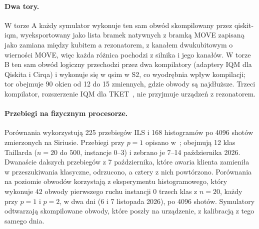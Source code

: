 \documentclass{scspaperproc}
\begin{document}
\paragraph{Dwa tory.}
W torze A każdy symulator wykonuje ten sam obwód skompilowany przez
qiskit-iqm, wyeksportowany jako lista bramek natywnych z bramką MOVE zapisaną
jako zamiana między kubitem a rezonatorem, z kanałem dwukubitowym o wierności
MOVE, więc każda różnica pochodzi z silnika i jego kanałów. W torze B ten sam
obwód logiczny przechodzi przez dwa kompilatory (adaptery IQM dla Qiskita
i Cirqa) i wykonuje się w qsim w S2, co wyodrębnia wpływ kompilacji; tor
obejmuje 90 okien od 12 do 15 zmiennych, gdzie obwody są najdłuższe. Trzeci
kompilator, rozszerzenie IQM dla TKET~\cite{sivarajah2020tket}, nie przyjmuje
urządzeń z rezonatorem.

\paragraph{Przebiegi na fizycznym procesorze.}
Porównania wykorzystują 225 przebiegów ILS i 168 histogramów po 4096 shotów
zmierzonych na Siriusie. Przebiegi przy $p = 1$ opisano w~\cite{anon2026b};
obejmują 12 klas Taillarda ($n = 20$
do $500$, instancje 0--3) i zebrano je 7--14 października 2026. Dwanaście dalszych
przebiegów z 7 października, które awaria klienta zamieniła w przeszukiwania
klasyczne, odrzucono, a cztery z nich powtórzono. Porównania na poziomie
obwodów korzystają z eksperymentu histogramowego, który wykonuje 42 obwody
pierwszego ruchu instancji 0 trzech klas z $n = 20$, każdy przy $p = 1$
i $p = 2$, w dwa dni (6 i 7 listopada 2026), po 4096 shotów. Symulatory
odtwarzają skompilowane obwody, które poszły na urządzenie, z kalibracją z tego
samego dnia.
\end{document}
